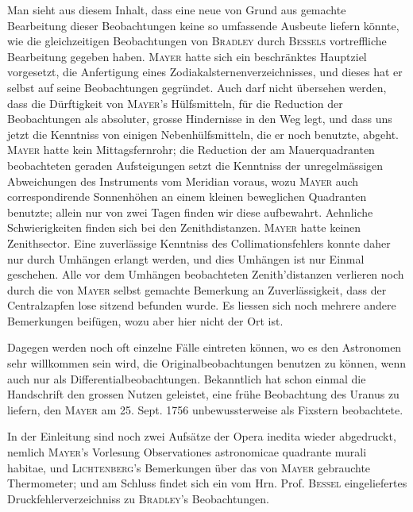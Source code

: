 Man sieht aus diesem Inhalt, dass eine neue von Grund aus gemachte Bearbeitung dieser Beobachtungen keine so umfassende Ausbeute liefern könnte, wie die gleichzeitigen Beobachtungen von \textsc{Bradley} durch \textsc{Bessels} vortreffliche Bearbeitung gegeben haben. \textsc{Mayer} hatte sich ein beschränktes Hauptziel vorgesetzt, die Anfertigung eines Zodiakalsternenverzeichnisses, und dieses hat er selbst auf seine Beobachtungen gegründet. Auch darf nicht übersehen werden, dass die Dürftigkeit von \textsc{Mayer}'s Hülfsmitteln, für die Reduction der Beobachtungen als absoluter, grosse Hindernisse in den Weg legt, und dass uns jetzt die Kenntniss von einigen Nebenhülfsmitteln, die er noch benutzte, abgeht. \textsc{Mayer} hatte kein Mittagsfernrohr; die Reduction der am Mauerquadranten beobachteten geraden Aufsteigungen setzt die Kenntniss der unregelmässigen Abweichungen des Instruments vom Meridian voraus, wozu \textsc{Mayer} auch correspondirende Sonnenhöhen an einem kleinen beweglichen Quadranten benutzte; allein nur von zwei Tagen finden wir diese aufbewahrt. Aehnliche Schwierigkeiten finden sich bei den Zenithdistanzen. \textsc{Mayer} hatte keinen Zenithsector. Eine zuverlässige Kenntniss des Collimationsfehlers konnte daher nur durch Umhängen erlangt werden, und dies Umhängen ist nur Einmal geschehen. Alle vor dem Umhängen beobachteten Zenith'distanzen verlieren noch durch die von \textsc{Mayer} selbst gemachte Bemerkung an Zuverlässigkeit, dass der Centralzapfen lose sitzend befunden wurde. Es liessen sich noch mehrere andere Bemerkungen beifügen, wozu aber hier nicht der Ort ist.

Dagegen werden noch oft einzelne Fälle eintreten können, wo es den Astronomen sehr willkommen sein wird, die Originalbeobachtungen benutzen zu können, wenn auch nur als Differentialbeobachtungen. Bekanntlich hat schon einmal die Handschrift den grossen Nutzen geleistet, eine frühe Beobachtung des Uranus zu liefern, den \textsc{Mayer} am 25. Sept. 1756 unbewussterweise als Fixstern beobachtete.

In der Einleitung sind noch zwei Aufsätze der Opera inedita wieder abgedruckt, nemlich \textsc{Mayer}'s Vorlesung Observationes astronomicae quadrante murali habitae, und \textsc{Lichtenberg}'s Bemerkungen über das von \textsc{Mayer} gebrauchte Thermometer; und am Schluss findet sich ein vom Hrn. Prof. \textsc{Bessel} eingeliefertes Druckfehlerverzeichniss zu \textsc{Bradley}'s Beobachtungen.
